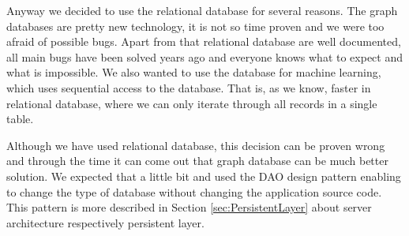 Anyway we decided to use the relational database for several reasons.
The graph databases are pretty new technology, it is not so time proven and we
were too afraid of  possible bugs. Apart from that relational database are well
documented, all main bugs have been solved years ago and everyone knows what to
expect and what is impossible.
We also wanted to use the database for machine learning, which uses sequential
access to the database. That is, as we know, faster in relational database,
where we can only iterate through all records in a single table.

Although we have used relational database, this decision can be proven wrong and
through the time it can come out that graph database can be much better
solution. We expected that a little bit and used the DAO design pattern enabling
to change the type of database without changing the application source code.
This pattern is more described in Section \ref{sec:PersistentLayer} about server
architecture respectively persistent layer.
